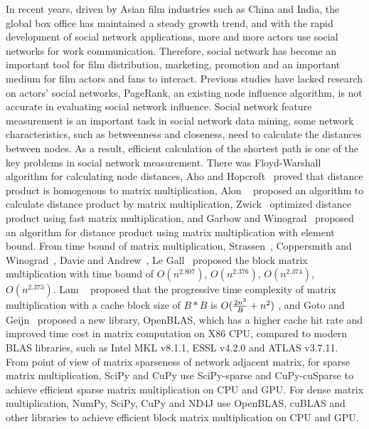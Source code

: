 \documentclass[review]{cvpr}
\begin{document}
In recent years, driven by Asian film industries such as China and India, the global box office has maintained a steady growth trend, and with the rapid development of social network applications, more and more actors use social networks for work communication.
Therefore, social network has become an important tool for film distribution, marketing, promotion and an important medium for film actors and fans to interact.
Previous studies have lacked research on actors' social networks, PageRank, an existing node influence algorithm, is not accurate in evaluating social network influence.
Social network feature measurement is an important task in social network data mining, some network characteristics, such as betweenness and closeness, need to calculate the distances between nodes.
As a result, efficient calculation of the shortest path is one of the key problems in social network measurement.
There was Floyd-Warshall~\cite{floyd1962algorithm,warshall1962theorem} algorithm for calculating node distances, Aho and Hopcroft~\cite{aho1974design} proved that distance product is homogenous to matrix multiplication,
Alon \etal~\cite{alon1997exponent} proposed an algorithm to calculate distance product by matrix multiplication, Zwick~\cite{zwick2002all} optimized distance product using fast matrix multiplication,
and Garbow and Winograd~\cite{garbow1985scaling} proposed an algorithm for distance product using matrix multiplication with element bound.
From time bound of matrix multiplication, Strassen~\cite{strassen1969gaussian}, Coppersmith and Winograd~\cite{coppersmith1987matrix}, Davie and Andrew~\cite{davie2013improved}, Le Gall~\cite{le2014powers} proposed the block matrix multiplication with time bound of \(O(n ^ {2.807})\), \(O(n^{2.376})\), \(O(n^{2.374})\), \(O(n^{2.373})\).
Lam \etal~\cite{lam1991cache} proposed that the progressive time complexity of matrix multiplication with a cache block size of $B*B$ is \(O({2n^3 \over B}+{n^2})\) ,
and Goto and Geijn~\cite{goto2008anatomy} proposed a new library, OpenBLAS, which has a higher cache hit rate and improved time cost in matrix computation on X86 CPU, compared to modern BLAS libraries, such as Intel MKL v8.1.1, ESSL v4.2.0 and ATLAS v3.7.11.
From point of view of matrix sparseness of network adjacent matrix, for sparse matrix multiplication, SciPy  and CuPy  use SciPy-sparse and CuPy-cuSparse to achieve efficient sparse matrix multiplication on CPU and GPU.
For dense matrix multiplication, NumPy, SciPy, CuPy and ND4J use OpenBLAS, cuBLAS and other libraries to achieve efficient block matrix multiplication on CPU and GPU.
\end{document}
